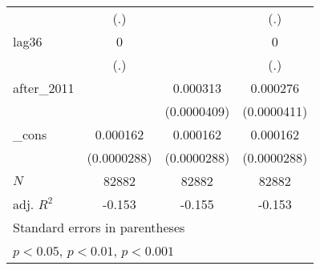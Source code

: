 {\begin{tabular}{l*{3}{c}}
            &         (.)         &                     &         (.)         \\
[1em]
lag36       &           0         &                     &           0         \\
            &         (.)         &                     &         (.)         \\
[1em]
after\_2011  &                     &    0.000313\sym{***}&    0.000276\sym{***}\\
            &                     & (0.0000409)         & (0.0000411)         \\
[1em]
\_cons      &    0.000162\sym{***}&    0.000162\sym{***}&    0.000162\sym{***}\\
            & (0.0000288)         & (0.0000288)         & (0.0000288)         \\
\hline
\(N\)       &       82882         &       82882         &       82882         \\
adj. \(R^{2}\)&      -0.153         &      -0.155         &      -0.153         \\
\hline\hline
\multicolumn{4}{l}{\footnotesize Standard errors in parentheses}\\
\multicolumn{4}{l}{\footnotesize \sym{*} \(p<0.05\), \sym{**} \(p<0.01\), \sym{***} \(p<0.001\)}\\
\end{tabular}
}
